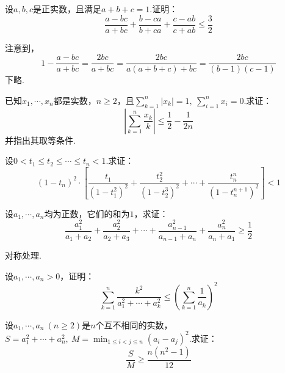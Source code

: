 \documentclass[cn,hazy,black,10pt,normal]{elegantnote}
\newcommand{\ssb}[1]{\left( #1 \right)}
\begin{document}
\begin{problem} %
	设$a,b,c$是正实数，且满足$a+b+c=1$.证明：$$\frac{a-bc}{a+bc} + \frac{b-ca}{b+ca} + \frac{c-ab}{c+ab} \leq \frac{3}{2}$$
\end{problem}
\begin{solution}
	注意到，$$1-\frac{a-bc}{a+bc} = \frac{2bc}{a+bc} = \frac{2bc}{a(a+b+c)+bc} = \frac{2bc}{(b-1)(c-1)}$$
	下略.
\end{solution}

\begin{problem} %
	已知$x_1, \cdots ,x_n$都是实数，$n \geq 2$，且$\sum_{k=1}^{n} |x_k|=1,~\sum_{i=1}^{n} x_i = 0$.求证：$$\left| \sum_{k=1}^{n} \frac{x_k}{k} \right| \leq \frac{1}{2}-\frac{1}{2n} $$
	并指出其取等条件.
\end{problem}
\begin{solution}
\end{solution}

\begin{problem} %
	设$0<t_1 \leq t_2 \leq \cdots \leq t_n <1$.求证：$$(1-t_n)^2 \cdot \left[ \frac{t_1}{(1-t_1^2)^2} + \frac{t_2^2}{(1-t_2^3)^2} + \cdots + \frac{t_n^n}{(1-t_n^{n+1})^2} \right] < 1$$
\end{problem}
\begin{solution}
\end{solution}

\begin{problem} %
	设$a_1, \cdots ,a_n$均为正数，它们的和为$1$，求证：$$\frac{a_1^2}{a_1+a_2} + \frac{a_2^2}{a_2+a_3} + \cdots + \frac{a_{n-1}^{2}}{a_{n-1}+a_n} + \frac{a_n^2}{a_n+a_1} \geq \frac{1}{2}$$
\end{problem}
\begin{solution}
	对称处理.%
\end{solution}

\begin{problem} %
	设$a_1, \cdots ,a_n>0$，证明：$$\sum_{k=1}^{n} \frac{k^2}{a_1^2+ \cdots + a_k^2} \leq \ssb{\sum_{k=1}^{n} \frac{1}{a_k}}^2$$
\end{problem}
\begin{solution}
\end{solution}

\begin{problem} %
	设$a_1,\cdots ,a_n~(n \geq 2)$是$n$个互不相同的实数，$S=a_1^2+\cdots +a_n^2,~\displaystyle{ M=\min_{1 \leq i < j \leq n} (a_i-a_j)^2 }$.求证：$$\frac{S}{M} \geq \frac{n(n^2-1)}{12}$$
\end{problem}
\begin{solution}
\end{solution}
\end{document}
